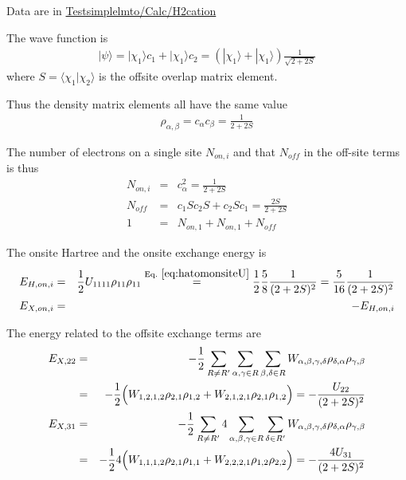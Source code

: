 \documentclass[11pt,a4paper]{report}
\begin{document}
Data are in \url{Testsimplelmto/Calc/H2cation}


The wave function is
\begin{eqnarray}
|\psi\rangle=
|\chi_1\rangle c_1+|\chi_1\rangle c_2
=\left(|\chi_1\rangle+|\chi_1\rangle\right)\frac{1}{\sqrt{2+2S}}
\end{eqnarray}
where $S=\langle\chi_1|\chi_2\rangle$ is the offsite overlap matrix
element.

Thus the density matrix elements all have the same value
\begin{eqnarray}
\rho_{\alpha,\beta}=c_\alpha c_\beta=\frac{1}{2+2S}
\end{eqnarray}

The number of electrons on a single site $N_{on,i}$ and that $N_{off}$
in the off-site terms is thus
\begin{eqnarray}
N_{on,i}&=& c_\alpha^2=\frac{1}{2+2S}
\nonumber\\
N_{off}&=& c_{1}S c_2 S+c_2Sc_1=\frac{2S}{2+2S}
\nonumber\\
1&=&N_{on,1}+N_{on,1}+N_{off}
\end{eqnarray}

The onsite Hartree and the onsite exchange  energy is
\begin{eqnarray}
E_{H,on,i}&=& \frac{1}{2} U_{1111}\rho_{11}\rho_{11}
\eqrel{eq:hatomonsiteU}{=}\frac{1}{2}\frac{5}{8}\frac{1}{(2+2S)^2}
=\frac{5}{16}\frac{1}{(2+2S)^2}
\nonumber\\
E_{X,on,i}&=&-E_{H,on,i}
\end{eqnarray}

The energy related to the offsite exchange terms are
\begin{eqnarray}
E_{X,22}&=&-\frac{1}{2}
\sum_{R\neq R'}\sum_{\alpha,\gamma\in R} \sum_{\beta,\delta\in R} 
W_{\alpha,\beta,\gamma,\delta}
\rho_{\delta,\alpha}\rho_{\gamma,\beta}
\nonumber\\
&=&-\frac{1}{2}\Bigl(W_{1,2,1,2}\rho_{2,1}\rho_{1,2}
+W_{2,1,2,1}\rho_{2,1}\rho_{1,2}\Bigr)
=-\frac{U_{22}}{(2+2S)^2}
\nonumber\\
E_{X,31}&=&-\frac{1}{2}
\sum_{R\neq R'} 4\sum_{\alpha,\beta,\gamma\in R} \sum_{\delta\in R'} 
W_{\alpha,\beta,\gamma,\delta}
\rho_{\delta,\alpha}\rho_{\gamma,\beta}
\nonumber\\
&=&-\frac{1}{2}4\Bigl(W_{1,1,1,2}\rho_{2,1}\rho_{1,1}
+W_{2,2,2,1}\rho_{1,2}\rho_{2,2}\Bigr)
=-\frac{4U_{31}}{(2+2S)^2}
\end{eqnarray}
\end{document}
